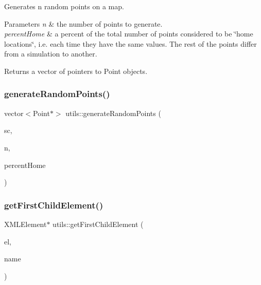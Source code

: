 Generates n random points on a map. 
\begin{DoxyParams}{Parameters}
{\em n} & the number of points to generate. \\
\hline
{\em percent\+Home} & a percent of the total number of points considered to be \char`\"{}home locations\char`\"{}, i.\+e. each time they have the same values. The rest of the points differ from a simulation to another. \\
\hline
\end{DoxyParams}
\begin{DoxyReturn}{Returns}
a vector of pointers to Point objects. 
\end{DoxyReturn}
\mbox{\label{namespaceutils_a40ef7258cb6dade6a56123b16fec4e9b}} 
\subsubsection{\texorpdfstring{generate\+Random\+Points()}{generateRandomPoints()}}
{\footnotesize\ttfamily vector$<$Point$\ast$$>$ utils\+::generate\+Random\+Points (\begin{DoxyParamCaption}\item[{\hyperlink{class_simulation_configuration}{Simulation\+Configuration} $\ast$}]{sc,  }\item[{unsigned long}]{n,  }\item[{double}]{percent\+Home }\end{DoxyParamCaption})}

\mbox{\label{namespaceutils_a929f9a6daaf5e504356ea4af5918c34b}} 
\subsubsection{\texorpdfstring{get\+First\+Child\+Element()}{getFirstChildElement()}}
{\footnotesize\ttfamily X\+M\+L\+Element$\ast$ utils\+::get\+First\+Child\+Element (\begin{DoxyParamCaption}\item[{X\+M\+L\+Element $\ast$}]{el,  }\item[{const char $\ast$}]{name }\end{DoxyParamCaption})\hspace{0.3cm}{\ttfamily [noexcept]}}

